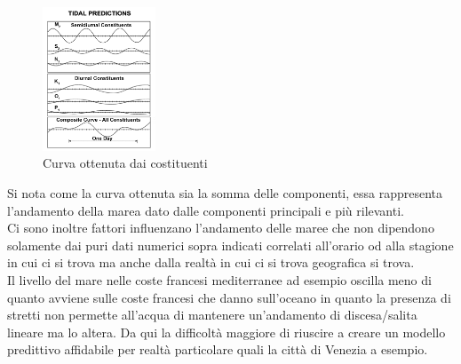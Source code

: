 \begin{figure}[H]
    \centering
    \includegraphics[width=0.3\textwidth]{res/cap2/Tidal_constituent_sum.png}
    \caption{Curva ottenuta dai costituenti}
\end{figure}

Si nota come la curva ottenuta sia la somma delle componenti, essa rappresenta l'andamento della marea dato dalle componenti principali e più rilevanti.\\
Ci sono inoltre fattori influenzano l'andamento delle maree che non dipendono solamente dai puri dati numerici sopra indicati correlati all'orario od alla stagione in cui ci si trova ma anche dalla realtà in cui ci si trova geografica si trova.\\
Il livello del mare nelle coste francesi mediterranee ad esempio oscilla meno di quanto avviene sulle coste francesi che danno sull'oceano in quanto la presenza di stretti non permette all'acqua di mantenere un'andamento di discesa/salita lineare ma lo altera. Da qui la difficoltà maggiore di riuscire a creare un modello predittivo affidabile per realtà particolare quali la città di Venezia a esempio.

